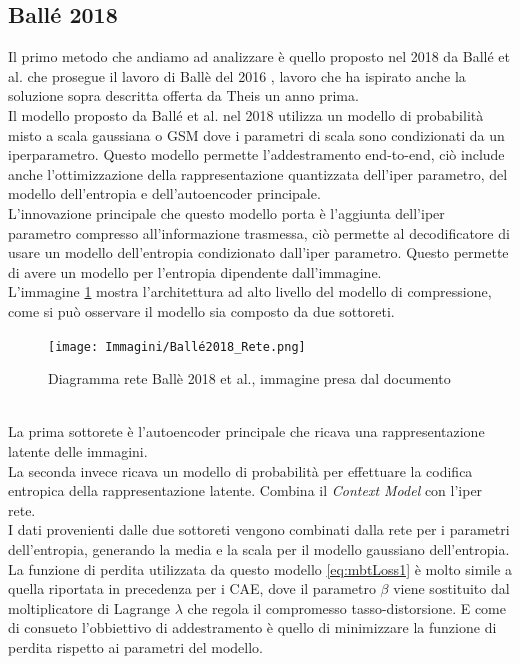 \subsection{Ballé 2018}
Il primo metodo che andiamo ad analizzare è quello proposto nel 2018 da Ballé et al. \cite{minnen2018joint} che prosegue il lavoro di Ballè del 2016 \cite{balle2018variational}, lavoro che ha ispirato anche la soluzione sopra descritta offerta da Theis un anno prima.\\
Il modello proposto da Ballé et al. nel 2018 utilizza un modello di probabilità misto a scala gaussiana o GSM dove i parametri di scala sono condizionati da un iperparametro. Questo modello permette l’addestramento end-to-end, ciò include anche l’ottimizzazione della rappresentazione quantizzata dell’iper parametro, del modello dell’entropia e dell’autoencoder principale.\\
L’innovazione principale che questo modello porta è l’aggiunta dell’iper parametro compresso all’informazione trasmessa, ciò permette al decodificatore di usare un modello dell’entropia condizionato dall’iper parametro. Questo permette di avere un modello per l’entropia dipendente dall’immagine.\\
L’immagine \ref{fig:balle2018Network} mostra l’architettura ad alto livello del modello di compressione, come si può osservare il modello sia composto da due sottoreti.
\begin{figure}[!h]
    \centering
    \texttt{[image: Immagini/Ballé2018\_Rete.png]}
    \caption{Diagramma rete Ballè 2018 et al., immagine presa dal documento \cite{minnen2018joint}}
    \label{fig:balle2018Network}
\end{figure}\\
La prima sottorete è l’autoencoder principale che ricava una rappresentazione latente delle immagini.\\
La seconda invece ricava un modello di probabilità per effettuare la codifica entropica della rappresentazione latente. Combina il \textit{Context Model} con l’iper rete.\\
I dati provenienti dalle due sottoreti vengono combinati dalla rete per i parametri dell’entropia, generando la media e la scala per il modello gaussiano dell’entropia.\\
La funzione di perdita utilizzata da questo modello \ref{eq:mbtLoss1} è molto simile a quella riportata in precedenza per i CAE, dove il parametro $\beta$ viene sostituito dal moltiplicatore di Lagrange $\lambda$ che regola il compromesso tasso-distorsione. E come di consueto l’obbiettivo di addestramento è quello di minimizzare la funzione di perdita rispetto ai parametri del modello.\\
